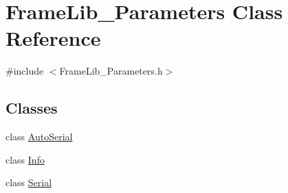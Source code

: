 \hypertarget{class_frame_lib___parameters}{}\section{Frame\+Lib\+\_\+\+Parameters Class Reference}
\label{class_frame_lib___parameters}


{\ttfamily \#include $<$Frame\+Lib\+\_\+\+Parameters.\+h$>$}

\subsection*{Classes}
\begin{DoxyCompactItemize}
\item 
class \hyperlink{class_frame_lib___parameters_1_1_auto_serial}{Auto\+Serial}
\item 
class \hyperlink{class_frame_lib___parameters_1_1_info}{Info}
\item 
class \hyperlink{class_frame_lib___parameters_1_1_serial}{Serial}
\end{DoxyCompactItemize}
